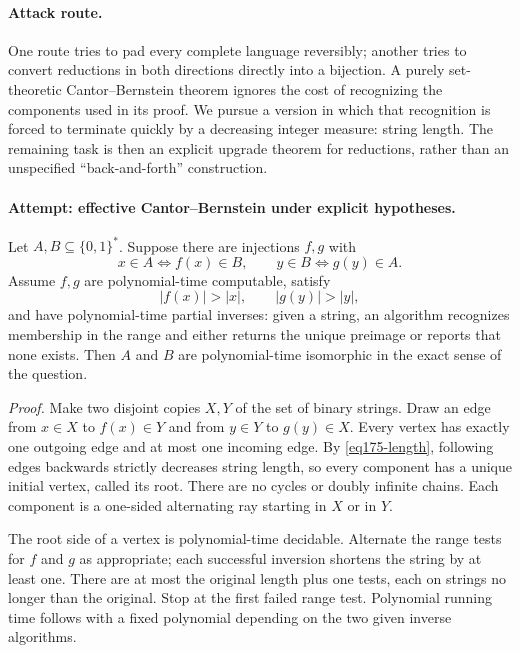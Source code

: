 \documentclass[11pt,a4paper]{article}
\numberwithin{equation}{section}
\begin{document}
\paragraph{Attack route.}
One route tries to pad every complete language reversibly; another tries to
convert reductions in both directions directly into a bijection. A purely
set-theoretic Cantor--Bernstein theorem ignores the cost of recognizing the
components used in its proof. We pursue a version in which that recognition
is forced to terminate quickly by a decreasing integer measure: string
length. The remaining task is then an explicit upgrade theorem for
reductions, rather than an unspecified ``back-and-forth'' construction.

\paragraph{Attempt: effective Cantor--Bernstein under explicit hypotheses.}
Let $A,B\subseteq\{0,1\}^*$. Suppose there are injections $f,g$ with
\[
 x\in A\iff f(x)\in B,\qquad y\in B\iff g(y)\in A.
\]
Assume $f,g$ are polynomial-time computable, satisfy
\begin{equation}\label{eq175-length}
              |f(x)|>|x|,\qquad |g(y)|>|y|,
\end{equation}
and have polynomial-time partial inverses: given a string, an algorithm
recognizes membership in the range and either returns the unique preimage
or reports that none exists. Then $A$ and $B$ are polynomial-time
isomorphic in the exact sense of the question.

\textit{Proof.} Make two disjoint copies $X,Y$ of the set of binary strings.
Draw an edge from $x\in X$ to $f(x)\in Y$ and from $y\in Y$ to
$g(y)\in X$. Every vertex has exactly one outgoing edge and at most one
incoming edge. By \eqref{eq175-length}, following edges backwards strictly
decreases string length, so every component has a unique initial vertex,
called its root. There are no cycles or doubly infinite chains. Each
component is a one-sided alternating ray starting in $X$ or in $Y$.

The root side of a vertex is polynomial-time decidable. Alternate the
range tests for $f$ and $g$ as appropriate; each successful inversion
shortens the string by at least one. There are at most the original length
plus one tests, each on strings no longer than the original. Stop at the
first failed range test. Polynomial running time follows with a fixed
polynomial depending on the two given inverse algorithms.
\end{document}
